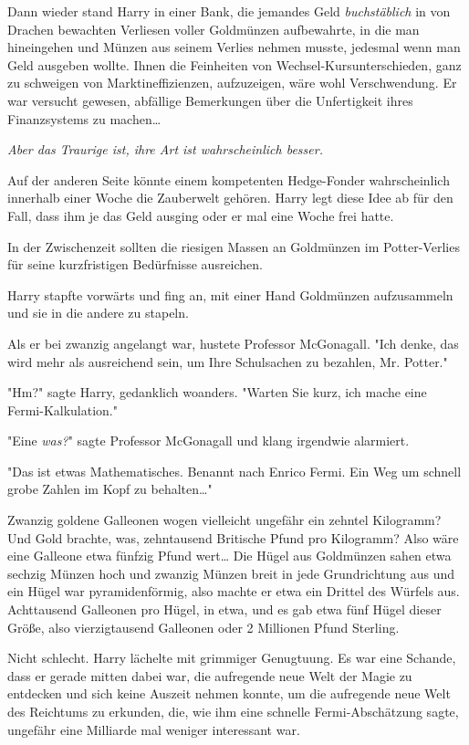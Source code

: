 {Dann wieder stand Harry in einer Bank, die jemandes Geld \emph{buchstäblich} in von Drachen bewachten Verliesen voller Goldmünzen aufbewahrte, in die man hineingehen und Münzen aus seinem Verlies nehmen musste, jedesmal wenn man Geld ausgeben wollte. Ihnen die Feinheiten von Wechsel-Kursunterschieden, ganz zu schweigen von Marktineffizienzen, aufzuzeigen, wäre wohl Verschwendung. Er war versucht gewesen, abfällige Bemerkungen über die Unfertigkeit ihres Finanzsystems zu machen…

\emph{Aber das Traurige ist, ihre Art ist wahrscheinlich besser.}

Auf der anderen Seite könnte einem kompetenten Hedge-Fonder wahrscheinlich innerhalb einer Woche die Zauberwelt gehören. Harry legt diese Idee ab für den Fall, dass ihm je das Geld ausging oder er mal eine Woche frei hatte.

In der Zwischenzeit sollten die riesigen Massen an Goldmünzen im Potter-Verlies für seine kurzfristigen Bedürfnisse ausreichen.

Harry stapfte vorwärts und fing an, mit einer Hand Goldmünzen aufzusammeln und sie in die andere zu stapeln.

Als er bei zwanzig angelangt war, hustete Professor McGonagall. "Ich denke, das wird mehr als ausreichend sein, um Ihre Schulsachen zu bezahlen, Mr. Potter."

"Hm?" sagte Harry, gedanklich woanders. "Warten Sie kurz, ich mache eine Fermi-Kalkulation."

"Eine \emph{was?}" sagte Professor McGonagall und klang irgendwie alarmiert.

"Das ist etwas Mathematisches. Benannt nach Enrico Fermi. Ein Weg um schnell grobe Zahlen im Kopf zu behalten…"

Zwanzig goldene Galleonen wogen vielleicht ungefähr ein zehntel Kilogramm? Und Gold brachte, was, zehntausend Britische Pfund pro Kilogramm? Also wäre eine Galleone etwa fünfzig Pfund wert… Die Hügel aus Goldmünzen sahen etwa sechzig Münzen hoch und zwanzig Münzen breit in jede Grundrichtung aus und ein Hügel war pyramidenförmig, also machte er etwa ein Drittel des Würfels aus. Achttausend Galleonen pro Hügel, in etwa, und es gab etwa fünf Hügel dieser Größe, also vierzigtausend Galleonen oder 2 Millionen Pfund Sterling.

Nicht schlecht. Harry lächelte mit grimmiger Genugtuung. Es war eine Schande, dass er gerade mitten dabei war, die aufregende neue Welt der Magie zu entdecken und sich keine Auszeit nehmen konnte, um die aufregende neue Welt des Reichtums zu erkunden, die, wie ihm eine schnelle Fermi-Abschätzung sagte, ungefähr eine Milliarde mal weniger interessant war.

}
